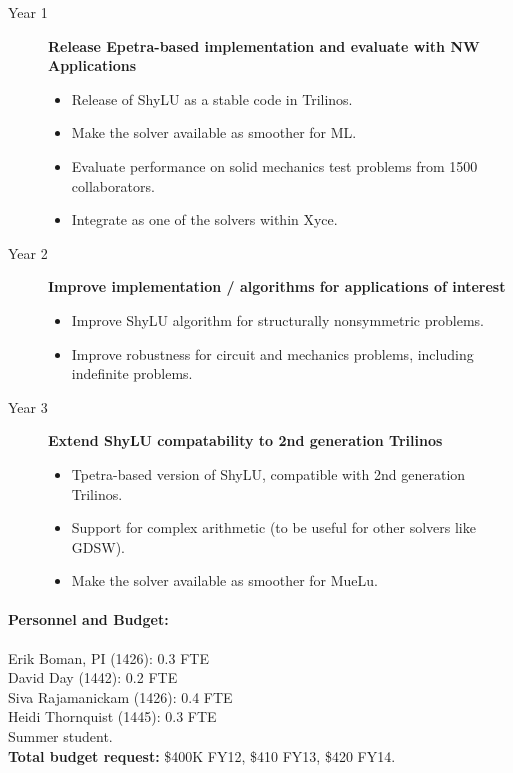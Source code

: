 \documentclass[10pt]{amsart}
\begin{document}
\begin{description}
\item[Year 1] {\bf Release Epetra-based implementation and evaluate with NW Applications}
  \begin{itemize} 
  \item Release of ShyLU as a stable code in Trilinos.
  \item Make the solver available as smoother for ML.
  \item Evaluate performance on solid mechanics test problems from 1500 collaborators.
  \item Integrate as one of the solvers within Xyce.
  \end{itemize}
\item[Year 2] {\bf Improve implementation / algorithms for applications of interest}
  \begin{itemize}
  \item Improve ShyLU algorithm for structurally nonsymmetric problems.
  \item Improve robustness for circuit and mechanics problems, including indefinite problems.
  \end{itemize}
\item[Year 3] {\bf Extend ShyLU compatability to 2nd generation Trilinos}
  \begin{itemize}
  \item Tpetra-based version of ShyLU, compatible with 2nd generation Trilinos.
  \item Support for complex arithmetic (to be useful for other solvers like GDSW).
  \item Make the solver available as smoother for MueLu.
  \end{itemize}
\end{description}


\paragraph{\bf Personnel and Budget:}
Erik Boman, PI (1426): 0.3 FTE\\
David Day (1442): 0.2 FTE\\
Siva Rajamanickam (1426): 0.4 FTE\\
Heidi Thornquist (1445): 0.3 FTE\\
Summer student.\\
%
\textbf{Total budget request:} \$400K FY12, \$410 FY13, \$420 FY14.
\end{document}
